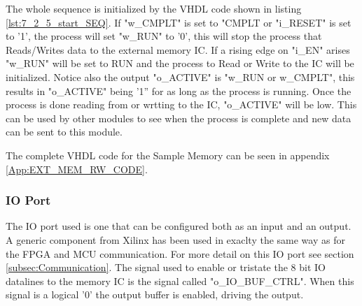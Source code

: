 The whole sequence is initialized by the VHDL code shown in listing \ref{lst:7_2_5_start_SEQ}. If "w\_CMPLT" is set to "CMPLT or "i\_RESET" is set to '1', the process will set "w\_RUN" to '0', this will stop the process that Reads/Writes data to the external memory IC. If a rising edge on "i\_EN" arises "w\_RUN" will be set to RUN and the process to Read or Write to the IC will be initialized. Notice also the output "o\_ACTIVE" is "w\_RUN or w\_CMPLT", this results in "o\_ACTIVE" being '1'' for as long as the process is running. Once the process is done reading from or wrtting to the IC, "o\_ACTIVE" will be low. This can be used by other modules to see when the process is complete and new data can be sent to this module.

 

The complete VHDL code for the Sample Memory can be seen in appendix \ref{App:EXT_MEM_RW_CODE}.

\subsubsection{IO Port}
The IO port used is one that can be configured both as an input and an output. A generic component from Xilinx has been used in exaclty the same way as for the FPGA and MCU communication. For more detail on this IO port see section \ref{subsec:Communication}. The signal used to enable or tristate the 8 bit IO datalines to the memory IC is the signal called "o\_IO\_BUF\_CTRL". When this signal is a logical '0' the output buffer is enabled, driving the output.